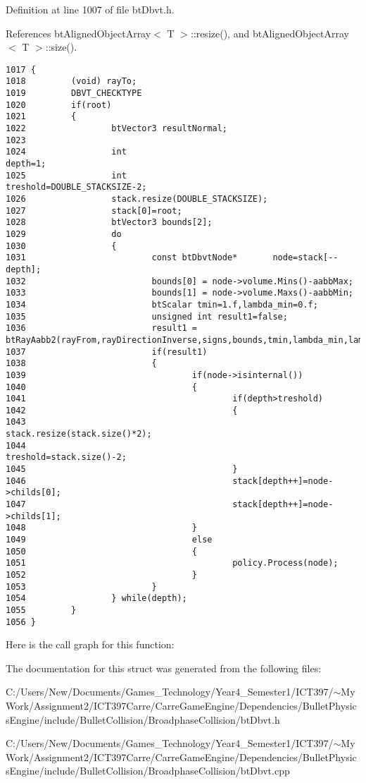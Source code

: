 Definition at line 1007 of file btDbvt.h.

References btAlignedObjectArray$<$ T $>$::resize(), and btAlignedObjectArray$<$ T $>$::size().

\begin{Code}\begin{verbatim}1017 {
1018         (void) rayTo;
1019         DBVT_CHECKTYPE
1020         if(root)
1021         {
1022                 btVector3 resultNormal;
1023 
1024                 int                                                             depth=1;
1025                 int                                                             treshold=DOUBLE_STACKSIZE-2;
1026                 stack.resize(DOUBLE_STACKSIZE);
1027                 stack[0]=root;
1028                 btVector3 bounds[2];
1029                 do      
1030                 {
1031                         const btDbvtNode*       node=stack[--depth];
1032                         bounds[0] = node->volume.Mins()-aabbMax;
1033                         bounds[1] = node->volume.Maxs()-aabbMin;
1034                         btScalar tmin=1.f,lambda_min=0.f;
1035                         unsigned int result1=false;
1036                         result1 = btRayAabb2(rayFrom,rayDirectionInverse,signs,bounds,tmin,lambda_min,lambda_max);
1037                         if(result1)
1038                         {
1039                                 if(node->isinternal())
1040                                 {
1041                                         if(depth>treshold)
1042                                         {
1043                                                 stack.resize(stack.size()*2);
1044                                                 treshold=stack.size()-2;
1045                                         }
1046                                         stack[depth++]=node->childs[0];
1047                                         stack[depth++]=node->childs[1];
1048                                 }
1049                                 else
1050                                 {
1051                                         policy.Process(node);
1052                                 }
1053                         }
1054                 } while(depth);
1055         }
1056 }
\end{verbatim}
\end{Code}




Here is the call graph for this function:

The documentation for this struct was generated from the following files:\begin{CompactItemize}
\item 
C:/Users/New/Documents/Games\_\-Technology/Year4\_\-Semester1/ICT397/$\sim$My Work/Assignment2/ICT397Carre/CarreGameEngine/Dependencies/BulletPhysicsEngine/include/BulletCollision/BroadphaseCollision/btDbvt.h\item 
C:/Users/New/Documents/Games\_\-Technology/Year4\_\-Semester1/ICT397/$\sim$My Work/Assignment2/ICT397Carre/CarreGameEngine/Dependencies/BulletPhysicsEngine/include/BulletCollision/BroadphaseCollision/btDbvt.cpp\end{CompactItemize}
